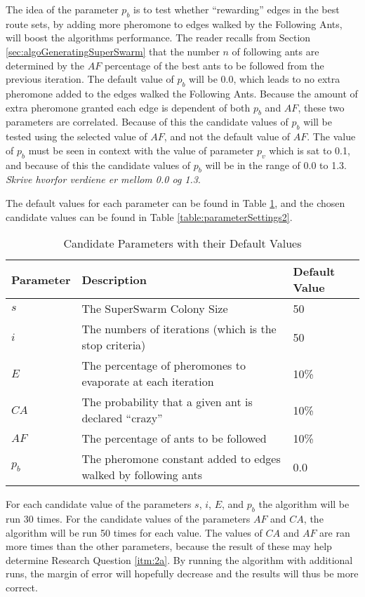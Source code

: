 The idea of the parameter $p_b$ is to test whether ``rewarding'' edges in the best route sets, by adding more pheromone to edges walked by the Following Ants, will boost the algorithms performance. The reader recalls from Section \vref{sec:algoGeneratingSuperSwarm} that the number $n$ of following ants are determined by the $AF$ percentage of the best ants to be followed from the previous iteration. The default value of $p_b$ will be 0.0, which leads to no extra pheromone added to the edges walked the Following Ants. Because the amount of extra pheromone granted each edge is dependent of both $p_b$ and $AF$, these two parameters are correlated. Because of this the candidate values of $p_b$ will be tested using the selected value of $AF$, and not the default value of $AF$. The value of $p_b$ must be seen in context with the value of parameter $p_v$ which is sat to 0.1, and because of this the candidate values of $p_b$ will be in the range of 0.0 to 1.3.\emph{\color{blue} Skrive hvorfor verdiene er mellom 0.0 og 1.3}.  

The default values for each parameter can be found in Table \ref{table:parameters}, and the chosen candidate values can be found in Table \vref{table:parameterSettings2}.

\begin{table}[H]
	\small
	\begin{tabular}{|l|l|l|}
    	\hline
    	Parameter & Description & Default Value\\
    	\hline
    	$s$ & The SuperSwarm Colony Size & 50\\
    	$i$ & The numbers of iterations (which is the stop criteria) & 50\\
    	$E$ & The percentage of pheromones to evaporate at each iteration & 10\%\\
    	$CA$ & The probability that a given ant is declared ``crazy'' & 10\%\\
    	$AF$ & The percentage of ants to be followed & 10\%\\
        $p_b$ & The pheromone constant added to edges walked by following ants & 0.0\\
   	    \hline
    \end{tabular}
    \caption {Candidate Parameters with their Default Values}
    \label{table:parameters}
\end{table}

For each candidate value of the parameters $s$, $i$, $E$, and $p_b$ the algorithm will be run 30 times.  For the candidate values of the parameters $AF$ and $CA$, the algorithm will be run 50 times for each value. 
The values of $CA$ and $AF$ are ran more times than the other parameters, because the result of these may help determine Research Question \vref{itm:2a}. By running the algorithm with additional runs, the margin of error will hopefully decrease and the results will thus be more correct.

